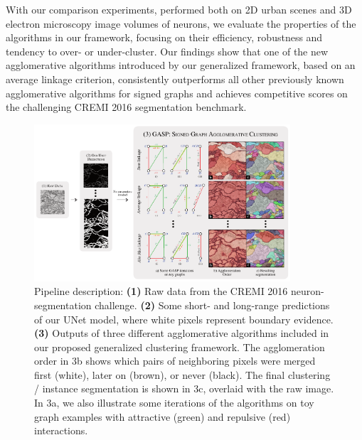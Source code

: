With our comparison experiments, performed both on 2D urban scenes and 3D electron microscopy image volumes of neurons, we evaluate the properties of the algorithms in our framework, focusing on their efficiency, robustness and tendency to over- or under-cluster.
Our findings show that one of the new agglomerative algorithms introduced by our generalized framework, based on an average linkage criterion, consistently outperforms all other previously known agglomerative algorithms for signed graphs and achieves competitive scores on the challenging CREMI 2016 segmentation benchmark.



\begin{figure}[t]
\centering
\includegraphics[width=0.85\textwidth]{./figs/intro_image_v2.pdf} %
\caption{ Pipeline description: \textbf{(1)} Raw data from the CREMI 2016 neuron-segmentation challenge. \textbf{(2)} Some short- and long-range predictions of our UNet model, where white pixels represent boundary evidence. \textbf{(3)} Outputs of three different agglomerative algorithms included in our proposed generalized clustering framework. The  agglomeration order in 3b shows which pairs of neighboring pixels were merged first (white), later on (brown), or never (black). The final clustering / instance segmentation is shown in 3c, overlaid with the raw image. In 3a, we also illustrate some iterations of the algorithms on toy graph examples with attractive (green) and repulsive (red) interactions.
\label{fig:intro_figure}}
\end{figure}
